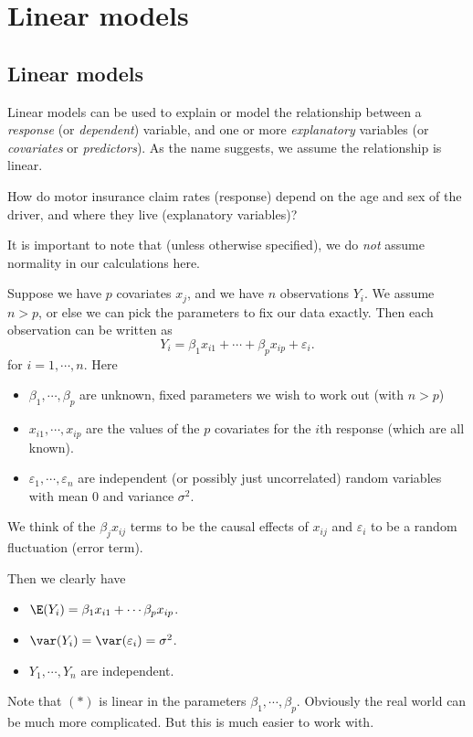\documentclass[a4paper]{article}
\begin{document}
\section{Linear models}
\subsection{Linear models}
Linear models can be used to explain or model the relationship between a \emph{response} (or \emph{dependent}) variable, and one or more \emph{explanatory} variables (or \emph{covariates} or \emph{predictors}). As the name suggests, we assume the relationship is linear.

\begin{eg}
  How do motor insurance claim rates (response) depend on the age and sex of the driver, and where they live (explanatory variables)?
\end{eg}

It is important to note that (unless otherwise specified), we do \emph{not} assume normality in our calculations here.

Suppose we have $p$ covariates $x_j$, and we have $n$ observations $Y_i$. We assume $n > p$, or else we can pick the parameters to fix our data exactly. Then each observation can be written as
\[
  Y_i = \beta_1 x_{i1} + \cdots + \beta_p x_{ip} + \varepsilon_i.\tag{(*)}
\]
for $i = 1, \cdots, n$. Here
\begin{itemize}
  \item $\beta_1, \cdots, \beta_p$ are unknown, fixed parameters we wish to work out (with $n > p$)
  \item $x_{i1}, \cdots, x_{ip}$ are the values of the $p$ covariates for the $i$th response (which are all known).
  \item $\varepsilon_1, \cdots, \varepsilon_n$ are independent (or possibly just uncorrelated) random variables with mean 0 and variance $\sigma^2$.
\end{itemize}
We think of the $\beta_j x_{ij}$ terms to be the causal effects of $x_{ij}$ and $\varepsilon_i$ to be a random fluctuation (error term).

Then we clearly have
\begin{itemize}
  \item $\E(Y_i) = \beta_1 x_{i1} + \cdots \beta_px_{ip}$.
  \item $\var(Y_i) = \var(\varepsilon_i) = \sigma^2$.
  \item $Y_1, \cdots, Y_n$ are independent.
\end{itemize}
Note that $(*)$ is linear in the parameters $\beta_1, \cdots, \beta_p$. Obviously the real world can be much more complicated. But this is much easier to work with.
\end{document}
